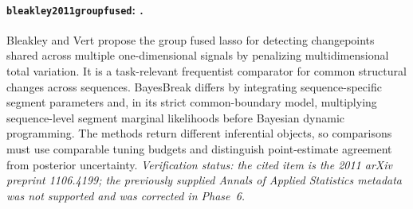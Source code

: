 \paragraph{\texttt{bleakley2011groupfused}: \citet{bleakley2011groupfused}.}
Bleakley and Vert propose the group fused lasso for detecting changepoints shared across multiple one-dimensional signals by penalizing multidimensional total variation. It is a task-relevant frequentist comparator for common structural changes across sequences. BayesBreak differs by integrating sequence-specific segment parameters and, in its strict common-boundary model, multiplying sequence-level segment marginal likelihoods before Bayesian dynamic programming. The methods return different inferential objects, so comparisons must use comparable tuning budgets and distinguish point-estimate agreement from posterior uncertainty. \textit{Verification status: the cited item is the 2011 arXiv preprint 1106.4199; the previously supplied Annals of Applied Statistics metadata was not supported and was corrected in Phase~6.}

